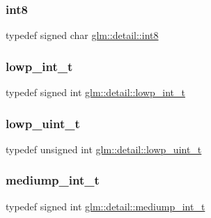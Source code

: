\mbox{\label{namespaceglm_1_1detail_a04b526a8d7a9b455602a0afa78c531e0}} 
\subsubsection{\texorpdfstring{int8}{int8}}
{\footnotesize\ttfamily typedef signed char \mbox{\hyperlink{namespaceglm_1_1detail_a04b526a8d7a9b455602a0afa78c531e0}{glm\+::detail\+::int8}}}

\mbox{\label{namespaceglm_1_1detail_a030a8128e369fc1f9c7982dc68a78ba7}} 
\subsubsection{\texorpdfstring{lowp\+\_\+int\+\_\+t}{lowp\_int\_t}}
{\footnotesize\ttfamily typedef signed int \mbox{\hyperlink{namespaceglm_1_1detail_a030a8128e369fc1f9c7982dc68a78ba7}{glm\+::detail\+::lowp\+\_\+int\+\_\+t}}}

\mbox{\label{namespaceglm_1_1detail_ad59c4581ad8ce0c3ef6146edaa7e15dc}} 
\subsubsection{\texorpdfstring{lowp\+\_\+uint\+\_\+t}{lowp\_uint\_t}}
{\footnotesize\ttfamily typedef unsigned int \mbox{\hyperlink{namespaceglm_1_1detail_ad59c4581ad8ce0c3ef6146edaa7e15dc}{glm\+::detail\+::lowp\+\_\+uint\+\_\+t}}}

\mbox{\label{namespaceglm_1_1detail_aede0757f19204d1d44f716b3dd66d13c}} 
\subsubsection{\texorpdfstring{mediump\+\_\+int\+\_\+t}{mediump\_int\_t}}
{\footnotesize\ttfamily typedef signed int \mbox{\hyperlink{namespaceglm_1_1detail_aede0757f19204d1d44f716b3dd66d13c}{glm\+::detail\+::mediump\+\_\+int\+\_\+t}}}

